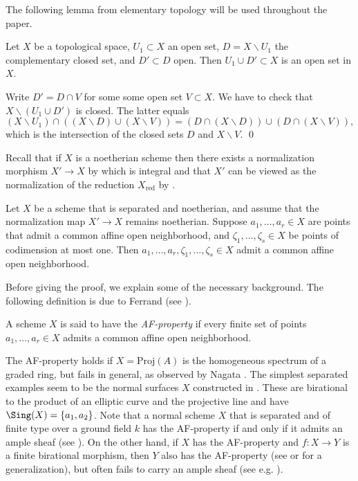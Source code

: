 \documentclass[12pt]{amsart}
\newcommand{\ra}{\rightarrow}
\begin{document}
The following lemma from elementary topology will be used throughout the paper.

\begin{lemma} \label{open set}
Let $X$ be a topological space, $U_1\subset X$ an open set, $D=X\smallsetminus U_1$ the complementary closed set,
and $D'\subset D$ open.  Then $U_1\cup D'\subset X$ is an open set in $X$.
\end{lemma}

\proof
Write  $D'=D\cap V$ for some   some open set $V\subset X$. We have to check that $X\smallsetminus (U_1\cup D')$ is closed.
The latter  equals
$$
(X\smallsetminus U_1)\cap \left((X\smallsetminus D)\cup (X\smallsetminus V)\right) = (D\cap(X\smallsetminus D)) \cup (D\cap (X\smallsetminus V)),
$$
which is the intersection of the closed sets $D$ and $X\smallsetminus V$.
\qed

Recall that if $X$ is a noetherian scheme then there exists a normalization morphism $X' \to X$ by \cite[Tag 035N]{stacks} which is integral and that $X'$ can be viewed as the normalization of the reduction $X_{\text{red}}$ by \cite[Tag 035O]{stacks}.

\begin{Theorem} \label{prop:CKcodim1new}
Let $X$ be a scheme that is separated and noetherian, and assume that the normalization map $X'\ra X$ remains noetherian. Suppose $a_1,\ldots,a_r\in X$ are points that admit a common affine open neighborhood, and $\zeta_1,\ldots,\zeta_s\in X$ be  points of codimension at most one. Then $a_1,\ldots,a_r,\zeta_1,\ldots,\zeta_s\in X$ admit a common affine open neighborhood.
\end{Theorem}

Before giving the proof, we explain some of the necessary background. The following definition is due to Ferrand (see \cite[Thm. 5.4]{MR2044495}).

\begin{definition} \label{def:AF} A scheme $X$ is said to have the \emph{AF-property} if every finite set of points
$a_1,\ldots,a_r\in X$ admits a common affine open neighborhood. \end{definition}

\begin{Example} \label{ex:AF} The AF-property holds if $X=\text{Proj}(A)$ is the homogeneous spectrum of a graded ring, but fails in general, as observed by Nagata \cite{MR97406}. The simplest separated examples seem to be the normal surfaces $X$ constructed in \cite{MR1726231}. These are birational to the product of an elliptic curve and the projective line and have $\Sing(X)=\{a_1,a_2\}$. Note that a normal scheme $X$ that is separated and of finite type over a ground field $k$ has the AF-property if and only if it admits an ample sheaf (see \cite[Cor. 2]{MR3096912}). On the other hand, if $X$ has the AF-property and $f:X\ra Y$ is a finite birational morphism, then $Y$ also 
has the AF-property (see \cite[Thm. 5.4]{MR2044495} or \cite[Thm. 3.3]{GrossRes} for a generalization), but often fails to carry an ample sheaf (see e.g. \cite[Cor. 1]{MR284437}).\end{Example}
\end{document}
